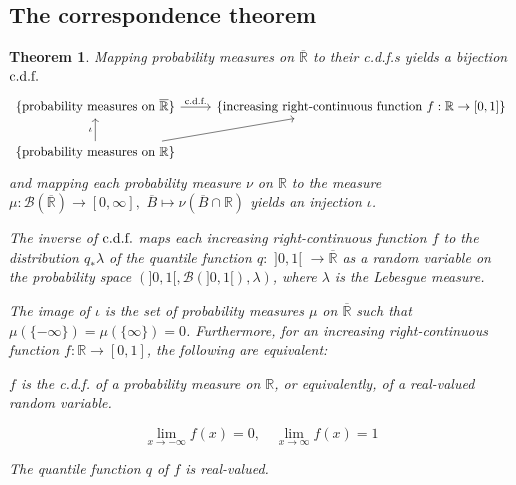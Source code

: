 \documentclass[11pt, a4paper, openany]{book}
\newtheorem{thm}{Theorem}\newtheorem{lem}{Lemma}\newtheorem{crl}{Corollary}
\theoremstyle{definition}
\newcommand{\er}{\overline{\mathbb{R}}}
\newenvironment{tight_enumerate}{\begin{enumerate}\itemsep -0.2em}{\end{enumerate}}
\begin{document}
\subsection{The correspondence theorem}
    \begin{thm}
        Mapping probability measures on $\er$ to their c.d.f.s yields a bijection $\textup{c.d.f.}$
        \[
            \begin{tikzcd}
                \{\text{probability measures on }\er\} \ar[r, "\textup{c.d.f.}"] & \{\text{increasing right-continuous function }f:\mathbb{R}\rightarrow [0,1]\}\\
                \{\text{probability measures on }\mathbb{R}\} \ar[u, "\iota"] \ar[ur]
            \end{tikzcd}
        \]
        and mapping each probability measure $\nu$ on $\mathbb{R}$ to the measure $\mu:\mathscr{B}(\er)\rightarrow [0,\infty],\,\,\overline{B}\mapsto \nu(\overline{B}\cap\mathbb{R})\textbf{}$ yields an injection $\iota$.
        
        The inverse of $\textup{c.d.f.}$ maps each increasing right-continuous function $f$ to the distribution $q_*\lambda$ of the quantile function $q:\,\,]0,1[\,\,\rightarrow \er$ as a random variable on the probability space $(]0,1[,\mathscr{B}(]0,1[),\lambda)$, where $\lambda$ is the Lebesgue measure.
        
        The image of $\iota$ is the set of probability measures $\mu$ on $\er$ such that $\mu(\{-\infty\})=\mu(\{\infty\})=0$. Furthermore, for an increasing right-continuous function $f:\mathbb{R}\rightarrow [0,1]$, the following are equivalent:
        \begin{tight_enumerate}
            \item $f$ is the c.d.f. of a probability measure on $\mathbb{R}$, or equivalently, of a real-valued random variable.
            \item \[
                \lim_{x\to-\infty}f(x)=0,\quad\lim_{x\to\infty}f(x)=1
            \]
            \item The quantile function $q$ of $f$ is real-valued.
        \end{tight_enumerate}
    \end{thm}
\end{document}
